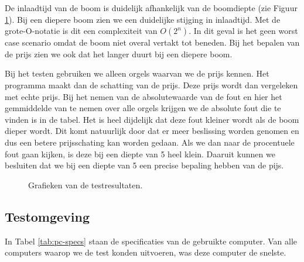 \newpage

De inlaadtijd van de boom is duidelijk afhankelijk van de boomdiepte (zie Figuur \ref{fig:test_results}). Bij een diepere boom zien we een duidelijke stijging in inlaadtijd. Met de grote-O-notatie is dit een complexiteit van $ O({2^n}) $. In dit geval is het geen worst case scenario omdat de boom niet overal vertakt tot beneden. Bij het bepalen van de prijs zien we ook dat het langer duurt bij een diepere boom.

Bij het testen gebruiken we alleen orgels waarvan we de prijs kennen. Het programma maakt dan de schatting van de prijs. Deze prijs wordt dan vergeleken met echte prijs. Bij het nemen van de absolutewaarde van de fout en hier het gemmiddelde van te nemen over alle orgels krijgen we de absolute fout die te vinden is in de tabel. Het is heel dijdelijk dat deze fout kleiner wordt als de boom dieper wordt. Dit komt natuurlijk door dat er meer beslissing worden genomen en dus een betere prijsschating kan worden gedaan. Als we dan naar de procentuele fout gaan kijken, is deze bij een diepte van 5 heel klein. Daaruit kunnen we besluiten dat we bij een diepte van 5 een precise bepaling hebben van de pijs.

\begin{figure}[ht]
    \centering


    \caption{Grafieken van de testresultaten.}
    \label{fig:test_results}
\end{figure}

\subsection{Testomgeving}
In Tabel \ref{tab:pc-specs} staan de specificaties van de gebruikte computer. Van alle computers waarop we de test konden uitvoeren, was deze computer de snelste.


